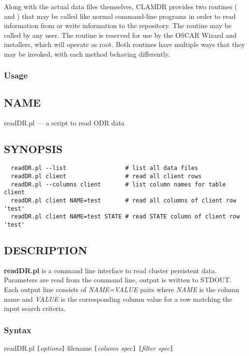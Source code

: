 Along with the actual data files themselves, CLAMDR provides two
routines ( and ) that may be called
like normal command-line programs in order to read information from or
write information to the repository. The  routine may
be called by any user. The  routine is reserved for
use by the OSCAR Wizard and installers, which will operate as root.
Both routines have multiple ways that they may be invoked, with each
method behaving differently.

\subsubsection{ Usage}

\subsection*{NAME}
readDR.pl --- a script to read ODR data

\subsection*{SYNOPSIS}\begin{verbatim}
  readDR.pl --list                 # list all data files
  readDR.pl client                 # read all client rows
  readDR.pl --columns client       # list column names for table client
  readDR.pl client NAME=test       # read all columns of client row 'test'
  readDR.pl client NAME=test STATE # read STATE column of client row 'test'
\end{verbatim}

\subsection*{DESCRIPTION}
{\bf readDR.pl} is a command line interface to read cluster persistent data.
Parameters are read from the command line, output is written to STDOUT.
Each output line consists of {\em NAME=VALUE\/} pairs where {\em NAME\/} is the
column name and {\em VALUE\/} is the corresponding column value for a row
matching the input search criteria.

\subsubsection*{Syntax}%

readDR.pl {\tt [}{\em options\/}{\tt ]} filename {\tt [}{\em column spec\/}{\tt ]} {\tt [}{\em filter spec\/}{\tt ]}

